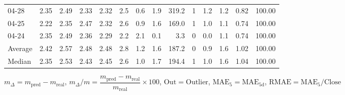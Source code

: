 \begin{threeparttable}
{\begin{tabular}{lrrrrrrrrrrrrr}
  04-28 &          2.35 &          2.49 &          2.33 &        2.32 &                 2.5 &                 0.6 &        1.9 &        319.2 &              1 &                 1.2 &              1.2 &            0.82 &                 100.00 \\
  04-25 &          2.22 &          2.35 &          2.47 &        2.32 &                 2.6 &                 0.9 &        1.6 &        169.0 &              1 &                 1.0 &              1.1 &            0.74 &                 100.00 \\
  04-24 &          2.35 &          2.49 &          2.36 &        2.29 &                 2.2 &                 2.1 &        0.1 &          3.3 &              0 &                 0.0 &              1.1 &            0.74 &                 100.00 \\
Average &          2.42 &          2.57 &          2.48 &        2.48 &                 2.8 &                 1.2 &        1.6 &        187.2 &              0 &                 0.9 &              1.6 &            1.02 &                 100.00 \\
 Median &          2.35 &          2.53 &          2.43 &        2.45 &                 2.6 &                 1.0 &        1.7 &        194.4 &              1 &                 1.0 &              1.6 &            1.04 &                 100.00 \\
\bottomrule
\end{tabular}
}
\begin{tablenotes}\footnotesize
\item $m_\Delta=m_{\text{pred}}-m_{\text{real}}$,
$m_\Delta/m=\dfrac{m_{\text{pred}}-m_{\text{real}}}{m_{\text{real}}}\times100$,
$\mathrm{Out}=\text{Outlier}$,
$\mathrm{MAE}_5=\mathrm{MAE}_{5\text{d}}$,
$\mathrm{RMAE}=\mathrm{MAE}_5/\text{Close}$
\end{tablenotes}
\end{threeparttable}
\endgroup

